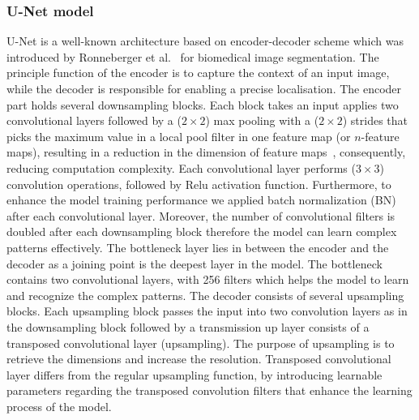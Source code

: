 \subsubsection{U-Net model}
U-Net is a well-known architecture based on encoder-decoder scheme which was introduced by Ronneberger et al.~\cite{Ronneberger2015} for biomedical image segmentation. 
The principle function of the encoder is to capture the context of an input image, while the decoder is responsible for enabling a precise localisation. 
The encoder part holds several downsampling blocks. 
Each block takes an input applies two convolutional layers followed by a (\(2\times2\)) max pooling with a (\(2\times2\)) strides that picks the maximum value in a local pool filter in one feature map (or \(n\)-feature maps), resulting in a reduction in the dimension of feature maps~\cite{Lecun2015}, consequently, reducing computation complexity.
Each convolutional layer performs (\(3\times3\)) convolution operations, followed by Relu activation function.
Furthermore, to enhance the model training performance we applied batch normalization (BN)~\cite{Ioffe2015} after each convolutional layer.
Moreover, the number of convolutional filters is doubled after each downsampling block therefore the model can learn complex patterns effectively. 
The bottleneck layer lies in between the encoder and the decoder as a joining point is the deepest layer in the model.
The bottleneck contains two convolutional layers, with 256 filters which helps the model to learn and recognize the complex patterns.
The decoder consists of several upsampling blocks. 
Each upsampling block passes the input into two convolution layers as in the downsampling block followed by a transmission up layer consists of a transposed convolutional layer (upsampling). 
The purpose of upsampling is to retrieve the dimensions and increase the resolution.
Transposed convolutional layer differs from the regular upsampling function, by introducing learnable parameters regarding the transposed convolution filters that enhance the learning process of the model. 
